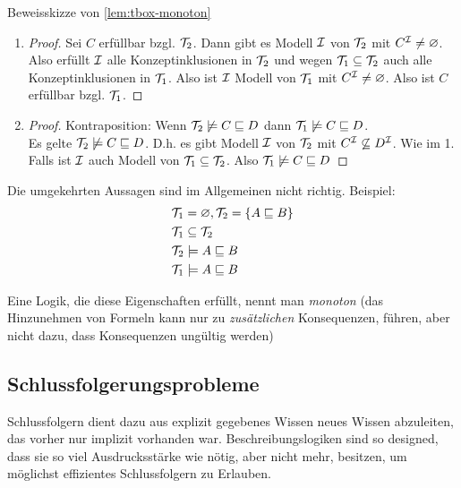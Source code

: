 \begin{tafel}[Beweisskizze]Beweisskizze von \autoref{lem:tbox-monoton}
\begin{enumerate}
  \item \begin{proof}
      Sei $C$ erfüllbar bzgl. $\mathcal{T}_2$.
  Dann gibt es Modell $\mathcal{I}$ von $\mathcal{T}_2$ mit $C^{\mathcal{I}} \neq \varnothing$.
  Also erfüllt $\mathcal{I}$ alle Konzeptinklusionen in $\mathcal{T}_2$ und wegen $\mathcal{T}_1 \subseteq \mathcal{T}_2$ auch alle Konzeptinklusionen in $\mathcal{T}_1$.
  Also ist $\mathcal{I}$ Modell von $\mathcal{T}_1$ mit $C^{\mathcal{I}} \neq \varnothing$.
  Also ist $C$ erfüllbar bzgl. $\mathcal{T}_1$.
  \end{proof}
  \item \begin{proof}
    Kontraposition: Wenn $\mathcal{T}_2 \not\models C \sqsubseteq D$ dann $\mathcal{T}_1 \not\models C \sqsubseteq D$. \\
  Es gelte $\mathcal{T}_2 \not\models C \sqsubseteq D$.
  D.h. es gibt Modell $\mathcal{I}$ von $\mathcal{T}_2$ mit $C^{\mathcal{I}} \not\subseteq D^{\mathcal{I}}$.
  Wie im 1. Falls ist $\mathcal{I}$ auch Modell von $\mathcal{T}_1 \subseteq \mathcal{T}_2$.
  Also $\mathcal{T}_1 \not\models C \sqsubseteq D$
  \end{proof}
\end{enumerate}

Die umgekehrten Aussagen sind im Allgemeinen nicht richtig. Beispiel:
\begin{align*}
    &\mathcal{T}_1 = \varnothing, \mathcal{T}_2 = \{A \sqsubseteq B\}\\
    &\mathcal{T}_1 \subseteq \mathcal{T}_2 \\
    &\mathcal{T}_2 \models A \sqsubseteq B\\
    &\mathcal{T}_1 \models A \sqsubseteq B
\end{align*}
\end{tafel}

Eine Logik, die diese Eigenschaften erfüllt, nennt man \emph{monoton} (das Hinzunehmen von Formeln kann nur zu \emph{zusätzlichen} Konsequenzen, führen, aber nicht dazu, dass Konsequenzen ungültig werden)

\subsection{Schlussfolgerungsprobleme}\label{schlussfolgerungsprobleme}

Schlussfolgern dient dazu aus explizit gegebenes Wissen neues Wissen abzuleiten, das vorher nur implizit vorhanden war. Beschreibungslogiken sind so designed, dass sie so viel Ausdrucksstärke wie nötig, aber nicht mehr, besitzen, um möglichst effizientes Schlussfolgern zu Erlauben.

